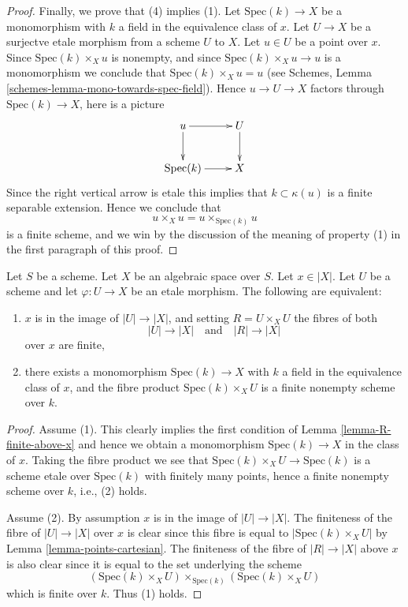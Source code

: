 \begin{proof}
\medskip\noindent
Finally, we prove that (4) implies (1). Let $\text{Spec}(k) \to X$
be a monomorphism with $k$ a field in the equivalence class of $x$.
Let $U \to X$ be a surjectve etale morphism from a scheme $U$ to $X$.
Let $u \in U$ be a point over $x$. Since $\text{Spec}(k) \times_X u$
is nonempty, and since $\text{Spec}(k) \times_X u \to u$ is a monomorphism
we conclude that $\text{Spec}(k) \times_X u = u$ (see
Schemes, Lemma \ref{schemes-lemma-mono-towards-spec-field}).
Hence $u \to U \to X$ factors through $\text{Spec}(k) \to X$, here is
a picture
$$
\xymatrix{
u \ar[r] \ar[d] & U \ar[d] \\
\text{Spec}(k) \ar[r] & X
}
$$
Since the right vertical arrow is etale this implies that $k \subset \kappa(u)$
is a finite separable extension. Hence we conclude that
$$
u \times_X u = u \times_{\text{Spec}(k)} u
$$
is a finite scheme, and we win by the discussion of the meaning of property
(1) in the first paragraph of this proof.
\end{proof}

\begin{lemma}
\label{lemma-weak-UR-finite-above-x}
Let $S$ be a scheme. Let $X$ be an algebraic space over $S$.
Let $x \in |X|$.
Let $U$ be a scheme and let $\varphi : U \to X$ be an etale morphism.
The following are equivalent:
\begin{enumerate}
\item $x$ is in the image of $|U| \to |X|$, and
setting $R = U \times_X U$ the fibres of both
$$
|U| \longrightarrow |X|
\quad\text{and}\quad
|R| \longrightarrow |X|
$$
over $x$ are finite,
\item there exists a monomorphism $\text{Spec}(k) \to X$ with $k$ a field
in the equivalence class of $x$, and
the fibre product $\text{Spec}(k) \times_X U$ is
a finite nonempty scheme over $k$.
\end{enumerate}
\end{lemma}

\begin{proof}
Assume (1). This clearly implies the first condition of
Lemma \ref{lemma-R-finite-above-x} and hence we obtain a monomorphism
$\text{Spec}(k) \to X$ in the class of $x$. Taking the fibre product
we see that $\text{Spec}(k) \times_X U \to \text{Spec}(k)$ is a scheme
etale over $\text{Spec}(k)$ with finitely many points, hence a finite
nonempty scheme over $k$, i.e., (2) holds.

\medskip\noindent
Assume (2). By assumption $x$ is in the image of
$|U| \to |X|$. The finiteness of the fibre of
$|U| \to |X|$ over $x$ is clear since this fibre is equal to
$|\text{Spec}(k) \times_X U|$ by Lemma \ref{lemma-points-cartesian}.
The finiteness of the fibre of $|R| \to |X|$ above $x$ is also clear
since it is equal to the set underlying the scheme
$$
(\text{Spec}(k) \times_X U) \times_{\text{Spec}(k)} (\text{Spec}(k) \times_X U)
$$
which is finite over $k$. Thus (1) holds.
\end{proof}

